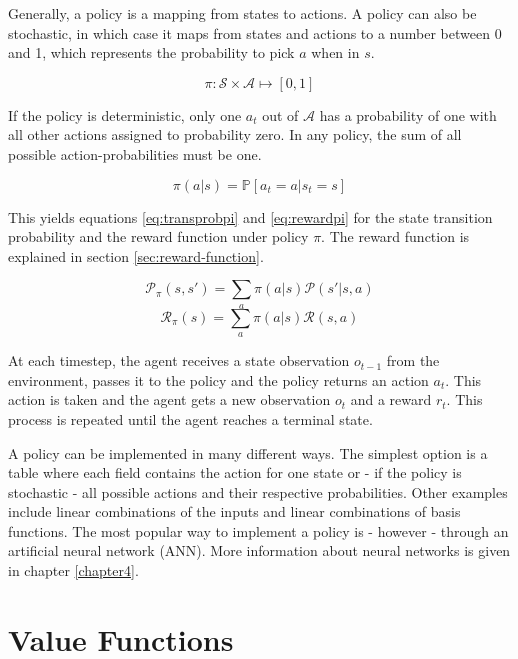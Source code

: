 Generally, a policy is a mapping from states to actions. A policy can also be stochastic, in which case it maps from states and actions to a number between 0 and 1, which represents the probability to pick $a$ when in $s$.

\begin{equation}
\pi: \mathcal{S} \times \mathcal{A} \mapsto [0,1]
\end{equation} 

If the policy is deterministic, only one $a_t$ out of $\mathcal{A}$ has a probability of one with all other actions assigned to probability zero. In any policy, the sum of all possible action-probabilities must be one.

\begin{equation}
\pi(a|s) = \mathbb{P}[a_t=a|s_t=s]
\end{equation}

This yields equations \ref{eq:transprobpi} and \ref{eq:rewardpi} for the state transition probability and the reward function under policy $\pi$. The reward function is explained in section \ref{sec:reward-function}.

\begin{equation}
\mathcal{P}_\pi(s,s')=\sum_a \pi(a|s)\mathcal{P}(s'|s,a)
\label{eq:transprobpi}
\end{equation}
\begin{equation}
\mathcal{R}_\pi(s) = \sum_a\pi(a|s)\mathcal{R}(s,a)
\label{eq:rewardpi}
\end{equation}

At each timestep, the agent receives a state observation $o_{t-1}$ from the environment, passes it to the policy and the policy returns an action $a_t$. This action is taken and the agent gets a new observation $o_t$ and a reward $r_t$. This process is repeated until the agent reaches a terminal state.

A policy can be implemented in many different ways. The simplest option is a table where each field contains the action for one state or - if the policy is stochastic - all possible actions and their respective probabilities. Other examples include linear combinations of the inputs and linear combinations of basis functions. The most popular way to implement a policy is - however - through an artificial neural network (ANN). More information about neural networks is given in chapter \ref{chapter4}.  

\section{Value Functions}
\label{sec:value-function}

